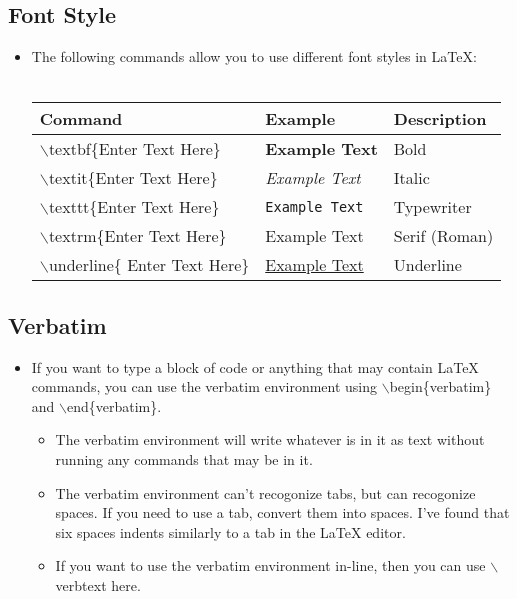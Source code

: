 	\subsection{Font Style}
		\begin{itemize}
			\item The following commands allow you to use different font styles in \LaTeX{}:\\\\
			\def\arraystretch{1.75}
			\begin{tabularx}{\textwidth}{|l|X|X|}
				\hline
				Command & Example & Description\\
				\hline
				$\backslash$textbf\{Enter Text Here\} & \textbf{Example Text} & Bold\\
				\hline
				$\backslash$textit\{Enter Text Here\} & \textit{Example Text} & Italic\\
				\hline
				$\backslash$texttt\{Enter Text Here\} & \texttt{Example Text} & Typewriter\\
				\hline
				$\backslash$textrm\{Enter Text Here\} & \textrm{Example Text} & Serif (Roman)\\
				\hline
				$\backslash$underline\{ Enter Text Here\} & \underline{Example Text} & Underline\\
				\hline
			\end{tabularx}
		\end{itemize}
	
	\subsection{Verbatim}
		\begin{itemize}
			\item If you want to type a block of code or anything that may contain \LaTeX{} commands, you can use the verbatim environment using $\backslash$begin\{verbatim\} and $\backslash$end\{verbatim\}.
			\begin{itemize}
				\item The verbatim environment will write whatever is in it as text without running any commands that may be in it.
				\item The verbatim environment can\rq{}t recogonize tabs, but can recogonize spaces. If you need to use a tab, convert them into spaces. I\rq{}ve found that six spaces indents similarly to a tab in the \LaTeX{} editor.
				\item If you want to use the verbatim environment in-line, then you can use $\backslash$verb\textbar{}text here\textbar{}.
			\end{itemize}
		\end{itemize}

